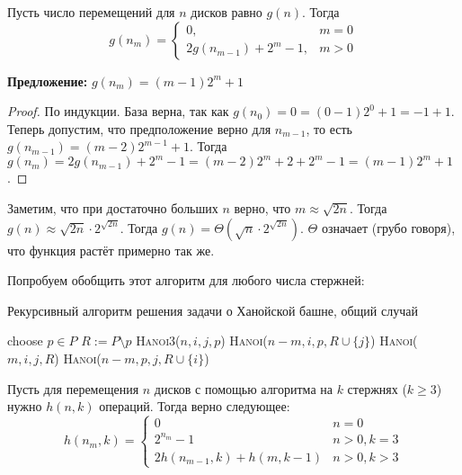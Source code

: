 \documentclass[12pt,a4paper]{article}
\begin{document}
Пусть число перемещений для $n$ дисков равно $g(n)$. Тогда
\[g(n_m) = \begin{cases}
    0,&m = 0\\
    2g(n_{m-1}) + 2^m - 1,&m > 0
\end{cases}\]

\textbf{Предложение:} $g(n_m) = (m-1)2^m + 1$
\begin{proof}
По индукции. База верна, так как $g(n_0) = 0 = (0 - 1)2^0 + 1 = - 1 + 1$. Теперь допустим, что предположение верно для $n_{m-1}$, то есть $g(n_{m-1}) = (m-2)2^{m-1} + 1$. Тогда $g(n_m) = 2g(n_{m-1}) + 2^m - 1 = (m - 2)2^m + 2 + 2^m - 1 = (m - 1)2^m + 1$.
\end{proof}

Заметим, что при достаточно больших $n$ верно, что $m \approx \sqrt{2n}$. Тогда $g(n) \approx \sqrt{2n} \cdot 2^{\sqrt{2n}}$. Тогда $g(n) = \Theta(\sqrt{n}\cdot2^{\sqrt{2n}})$. $\Theta$ означает (грубо говоря), что функция растёт примерно так же.

Попробуем обобщить этот алгоритм для любого числа стержней:

\begin{algorithm}
\caption{Рекурсивный алгоритм решения задачи о Ханойской башне, общий случай}
\begin{algorithmic}[1]
\State {}
    \State choose $p \in P$
    \State $R \mathrel{:=} P \setminus p$
        \State \textsc{Hanoi3}($n,i,j,p$)
    \Else
        \State \textsc{Hanoi}($n-m,i,p,R \cup \{j\}$)
        \State \textsc{Hanoi}($m,i,j,R$)
        \State \textsc{Hanoi}($n-m,p,j,R \cup \{i\}$)
    \EndIf
\EndIf
\EndFunction
\end{algorithmic}
\end{algorithm}

Пусть для перемещения $n$ дисков с помощью алгоритма на $k$ стержнях ($k \geq 3$) нужно $h(n,k)$ операций. Тогда верно следующее:
\[h(n_m, k) = \begin{cases}
    0& n=0\\
    2^{n_m}-1& n>0, k=3\\
    2h(n_{m-1}, k) + h(m, k-1)& n > 0, k > 3
\end{cases}\]
\end{document}
